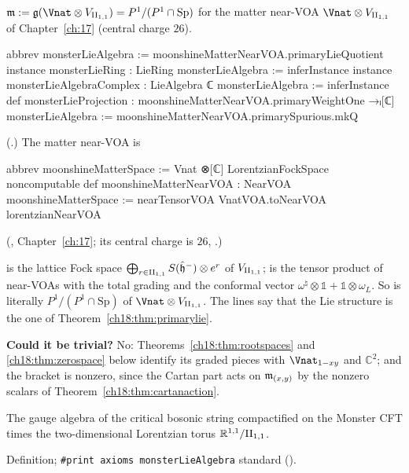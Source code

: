 \begin{definition}\label{ch18:def:monsterlie}
$\chXVIIIm:=\mathfrak g(\Vnat\otimes V_{\chXVIIIII})=P^1/(P^1\cap\mathrm{Sp})$ for the matter near-VOA
$\Vnat\otimes V_{\chXVIIIII}$ of Chapter~\ref{ch:17} (central charge $26$).
\end{definition}
\begin{leancode}
abbrev monsterLieAlgebra := moonshineMatterNearVOA.primaryLieQuotient
instance monsterLieRing : LieRing monsterLieAlgebra := inferInstance
instance monsterLieAlgebraComplex : LieAlgebra ℂ monsterLieAlgebra := inferInstance
def monsterLieProjection : moonshineMatterNearVOA.primaryWeightOne →ₗ[ℂ] monsterLieAlgebra :=
  moonshineMatterNearVOA.primarySpurious.mkQ
\end{leancode}
(.)  The matter near-VOA is
\begin{leancode}
abbrev moonshineMatterSpace := Vnat ⊗[ℂ] LorentzianFockSpace
noncomputable def moonshineMatterNearVOA : NearVOA moonshineMatterSpace :=
  nearTensorVOA VnatVOA.toNearVOA lorentzianNearVOA
\end{leancode}
(, Chapter~\ref{ch:17}; its central charge is
$26$, .)
\begin{dictionary}
 is the lattice Fock space $\bigoplus_{r\in\mathrm{II}_{1,1}}S(\hat{\mathfrak h}^-)\otimes e^r$ of
$V_{\mathrm{II}_{1,1}}$;  is the tensor product of near-VOAs with the total grading and the conformal
vector $\omega^\natural\otimes\mathbb 1+\mathbb 1\otimes\omega_L$.  So  is literally $P^1/(P^1\cap\mathrm{Sp})$ of
$\Vnat\otimes V_{\chXVIIIII}$.  The  lines say that the Lie structure is the one of
Theorem~\ref{ch18:thm:primarylie}.

\textbf{Could it be trivial?}  No: Theorems~\ref{ch18:thm:rootspaces} and \ref{ch18:thm:zerospace} below identify its
graded pieces with $\Vnat_{1-xy}$ and $\mathbb C^2$; and the bracket is nonzero, since the Cartan part acts on
$\mathfrak{m}_{(x,y)}$ by the nonzero scalars of Theorem~\ref{ch18:thm:cartanaction}.
\end{dictionary}
\begin{physics}
The gauge algebra of the critical bosonic string compactified on the Monster CFT times the
two-dimensional Lorentzian torus $\mathbb R^{1,1}/\mathrm{II}_{1,1}$.
\end{physics}
\begin{status}Definition; \texttt{\#print axioms monsterLieAlgebra} standard ().\end{status}

